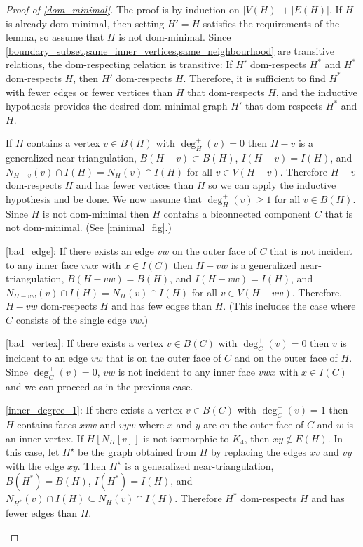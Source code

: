 \documentclass[a4paper,UKenglish,cleveref, autoref, thm-restate]{lipics-v2021}
\begin{document}
\begin{proof}[Proof of \cref{dom_minimal}]
  The proof is by induction on $|V(H)|+|E(H)|$.  If $H$ is already dom-minimal, then setting $H'=H$ satisfies the requirements of the lemma, so assume that $H$ is not dom-minimal.  Since \cref{boundary_subset,same_inner_vertices,same_neighbourhood} are transitive relations, the dom-respecting relation is transitive: If $H'$ dom-respects $H^*$ and $H^*$ dom-respects $H$, then $H'$ dom-respects $H$.  Therefore, it is sufficient to find $H^*$ with fewer edges or fewer vertices than $H$ that dom-respects $H$, and the inductive hypothesis provides the desired dom-minimal graph $H'$ that dom-respects $H^*$ and $H$.

  If $H$ contains a vertex $v\in B(H)$ with $\deg^+_H(v)=0$ then $H-v$ is a generalized near-triangulation, $B(H-v)\subset B(H)$, $I(H-v)=I(H)$, and $N_{H-v}(v)\cap I(H)=N_{H}(v)\cap I(H)$ for all $v\in V(H-v)$. Therefore $H-v$ dom-respects $H$ and has fewer vertices than $H$ so we can apply the inductive hypothesis and be done.  We now assume that $\deg^+_H(v)\ge 1$ for all $v\in B(H)$.  Since $H$ is not dom-minimal then $H$ contains a biconnected component $C$ that is not dom-minimal. (See \cref{minimal_fig}.)
  \begin{compactenum}
    \item \cref{bad_edge}: If there exists an edge $vw$ on the outer face of $C$ that is not incident to any inner face $vwx$ with $x\in I(C)$ then $H-vw$ is a generalized near-triangulation, $B(H-vw)=B(H)$, and $I(H-vw)=I(H)$, and $N_{H-vw}(v)\cap I(H)=N_{H}(v)\cap I(H)$ for all $v\in V(H-vw)$. Therefore, $H-vw$ dom-respects $H$ and has few edges than $H$. (This includes the case where $C$ consists of the single edge $vw$.)

    \item \cref{bad_vertex}: If there exists a vertex $v\in B(C)$ with $\deg^+_C(v)=0$ then $v$ is incident to an edge $vw$ that is on the outer face of $C$ and on the outer face of $H$. Since $\deg^+_C(v)=0$, $vw$ is not incident to any inner face $vwx$ with $x\in I(C)$ and we can proceed as in the previous case.

    \item \cref{inner_degree_1}: If there exists a vertex $v\in B(C)$ with $\deg^+_C(v)=1$ then $H$ contains faces $xvw$ and $vyw$ where $x$ and $y$ are on the outer face of $C$ and $w$ is an inner vertex. If $H[N_H[v]]$ is not isomorphic to $K_4$, then $xy\not\in E(H)$.  In this case, let $H^\star$ be the graph obtained from $H$ by replacing the edges $xv$ and $vy$ with the edge $xy$. Then $H^\star$ is a generalized near-triangulation, $B(H^*)=B(H)$, $I(H^*)=I(H)$, and $N_{H^*}(v)\cap I(H)\subseteq N_{H}(v)\cap I(H)$.  Therefore $H^*$ dom-respects $H$ and has fewer edges than $H$. \qedhere
  \end{compactenum}
\end{proof}
\end{document}
